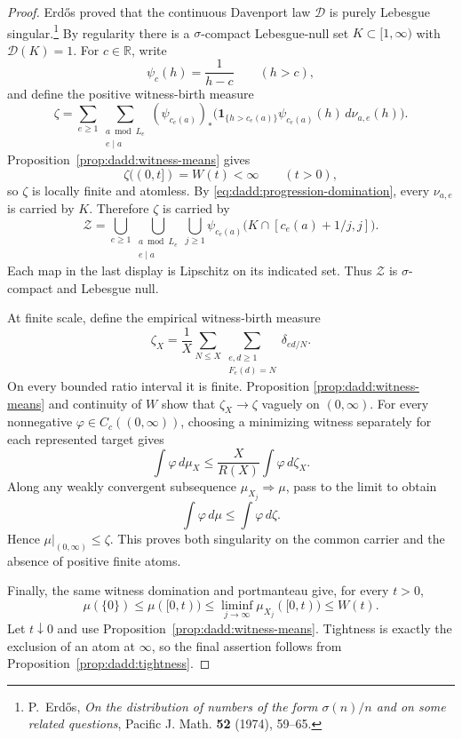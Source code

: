 \begin{proof}
Erd\H{o}s proved that the continuous Davenport law $\mathcal D$ is
purely Lebesgue singular.\footnote{P.~Erd\H{o}s, \emph{On the
distribution of numbers of the form $\sigma(n)/n$ and on some
related questions}, Pacific J. Math. \textbf{52} (1974), 59--65.}
By regularity there is a $\sigma$-compact Lebesgue-null set
$K\subset[1,\infty)$ with $\mathcal D(K)=1$.
For $c\in\mathbb R$, write
\[
 \psi_c(h)=\frac1{h-c}\qquad(h>c),
\]
and define the positive witness-birth measure
\begin{equation}
\label{eq:dadd:singular-envelope}
 \zeta
 =\sum_{e\geq1}
   \sum_{\substack{a\bmod L_e\\e\mid a}}
    (\psi_{c_e(a)})_*
       \bigl(\boldsymbol1_{\{h>c_e(a)\}}
               \psi_{c_e(a)}(h)\,d\nu_{a,e}(h)\bigr).
\end{equation}
Proposition~\ref{prop:dadd:witness-means} gives
\[
 \zeta((0,t])=W(t)<\infty\qquad(t>0),
\]
so $\zeta$ is locally finite and atomless. By
\eqref{eq:dadd:progression-domination}, every $\nu_{a,e}$ is
carried by $K$. Therefore $\zeta$ is carried by
\begin{equation}
\label{eq:dadd:universal-null-carrier}
 \mathcal Z
 =\bigcup_{e\geq1}
    \bigcup_{\substack{a\bmod L_e\\e\mid a}}
    \bigcup_{j\geq1}
      \psi_{c_e(a)}
       \bigl(K\cap[c_e(a)+1/j,j]\bigr).
\end{equation}
Each map in the last display is Lipschitz on its indicated set.
Thus $\mathcal Z$ is $\sigma$-compact and Lebesgue null.

At finite scale, define the empirical witness-birth measure
\[
 \zeta_X
 =\frac1X\sum_{N\leq X}
    \sum_{\substack{e,d\geq1\\F_e(d)=N}}
       \delta_{ed/N}.
\]
On every bounded ratio interval it is finite. Proposition
\ref{prop:dadd:witness-means} and continuity of $W$ show that
$\zeta_X\to\zeta$ vaguely on $(0,\infty)$. For every
nonnegative $\varphi\in C_c((0,\infty))$, choosing a minimizing
witness separately for each represented target gives
\[
 \int\varphi\,d\mu_X
 \leq\frac X{R(X)}\int\varphi\,d\zeta_X.
\]
Along any weakly convergent subsequence $\mu_{X_j}\Rightarrow\mu$,
pass to the limit to obtain
\[
 \int\varphi\,d\mu\leq\int\varphi\,d\zeta.
\]
Hence $\mu|_{(0,\infty)}\leq\zeta$. This proves both singularity
on the common carrier and the absence of positive finite atoms.

Finally, the same witness domination and portmanteau give, for
every $t>0$,
\[
 \mu(\{0\})
 \leq\mu([0,t))
 \leq\liminf_{j\to\infty}\mu_{X_j}([0,t))
 \leq W(t).
\]
Let $t\downarrow0$ and use
Proposition~\ref{prop:dadd:witness-means}. Tightness is exactly
the exclusion of an atom at $\infty$, so the final assertion
follows from Proposition~\ref{prop:dadd:tightness}.
\end{proof}

